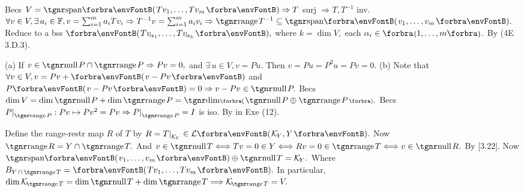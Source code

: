 Becs $V=\Span{Tv_1,\dots,Tv_m}\Rightarrow T$ surj $\Rightarrow T,T^{-1}$ inv.\parSol{}
$\forall v\in V,\exists\,a_i\in\Fbb, v=\sum_{i=1}^ma_i Tv_i\Rightarrow T^{-1}v=\sum_{i=1}^ma_i v_i\Rightarrow \range T^{-1}\subseteq\Span{v_1,\dots,v_m}.$\vspace{2pt}\parSol{}
\Or Reduce to a bss $\Par{Tv_{\:\!\!\alpha_1},\dots,Tv_{\:\!\!\alpha_k}},$ where $k=\dim V,$ each $\alpha_i\in\Bra{1,\dots,m}.$ By (4E 3.D.3).\PfEnd
\SepLine

(a) If $v\in\null P\cap\range P\Rightarrow Pv=0,$ and $\exists\,u\in V,v=Pu.$ Then $v=Pu=P^2 u=Pv=0.$\parSol{}
(b) Note that $\forall v\in V,v=Pv+\Par{v-Pv}$ and $P\Par{v-Pv}=0\Rightarrow v-Pv\in\null P.$\parSol{\Hb}
\Or Becs $\dim V=\dim\null P+\dim\range P=\Dim\BigPar{\null P\oplus\range P}.$\PfEnd{\vspace{3pt}}\parSol{}
\Or Becs $P\mmid_{\range P}:Pv\mapsto Pv^2=Pv\Rightarrow P\mmid_{\range P}=I$ is iso. By {\COROLLARY} in Exe (12).\PfEnd
\SepLine

Define the range-restr map $R$ of $T$ by $R=T\mmid_{\mathcal{K}_{\!Y}}\in\Lm{\mathcal{K}_{\!Y},Y}.$ Now $\range R=Y\cap \range T.$\parSol{}
And $v\in\null T\Longleftrightarrow Tv=0\in Y\Longleftrightarrow Rv=0\in\range T\Longleftrightarrow v\in\null R.$ By [3.22].\PfEnd\vspace{2pt}
\AComm Now $\Span{v_1,\dots,v_m}\oplus\null T=\mathcal{K}_{\!Y}.$ {Where $B_{Y\,\cap\,\range T}=\Par{Tv_1,\dots,Tv_m}.$}\vspace{0pt}\parCom
In particular, $\dim\mathcal{K}_{\!\range T}=\dim\null T+\dim\range T\Longrightarrow\mathcal{K}_{\!\range T}=V.$
\SepLine

